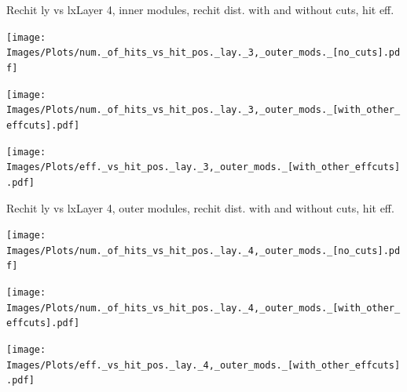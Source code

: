 \documentclass{beamer}
\begin{document}
\begin{frame}{Rechit ly vs lx}{Layer 4, inner modules, rechit dist. with and without cuts, hit eff.}
  \begin{minipage}{0.32\textwidth}
    \centering
    \texttt{[image: Images/Plots/num.\_of\_hits\_vs\_hit\_pos.\_lay.\_3,\_outer\_mods.\_[no\_cuts].pdf]}
  \end{minipage}%
  \begin{minipage}{0.32\textwidth}
    \centering
    \texttt{[image: Images/Plots/num.\_of\_hits\_vs\_hit\_pos.\_lay.\_3,\_outer\_mods.\_[with\_other\_effcuts].pdf]}
  \end{minipage}%
  \begin{minipage}{0.32\textwidth}
    \centering
    \texttt{[image: Images/Plots/eff.\_vs\_hit\_pos.\_lay.\_3,\_outer\_mods.\_[with\_other\_effcuts].pdf]}
  \end{minipage}
\end{frame}

\begin{frame}{Rechit ly vs lx}{Layer 4, outer modules, rechit dist. with and without cuts, hit eff.}
  \begin{minipage}{0.32\textwidth}
    \centering
    \texttt{[image: Images/Plots/num.\_of\_hits\_vs\_hit\_pos.\_lay.\_4,\_outer\_mods.\_[no\_cuts].pdf]}
  \end{minipage}%
  \begin{minipage}{0.32\textwidth}
    \centering
    \texttt{[image: Images/Plots/num.\_of\_hits\_vs\_hit\_pos.\_lay.\_4,\_outer\_mods.\_[with\_other\_effcuts].pdf]}
  \end{minipage}%
  \begin{minipage}{0.32\textwidth}
    \centering
    \texttt{[image: Images/Plots/eff.\_vs\_hit\_pos.\_lay.\_4,\_outer\_mods.\_[with\_other\_effcuts].pdf]}
  \end{minipage}
\end{frame}
\end{document}
